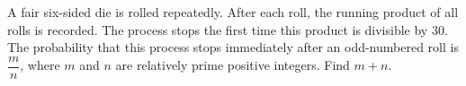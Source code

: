 A fair six-sided die is rolled repeatedly. After each roll, the running product of all rolls is recorded. The process stops the first time this product is divisible by \(30\). The probability that this process stops immediately after an odd-numbered roll is \(\dfrac{m}{n}\), where \(m\) and \(n\) are relatively prime positive integers. Find \(m+n\).
